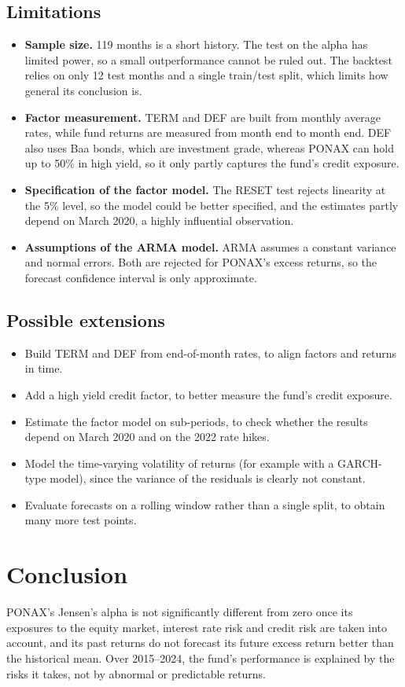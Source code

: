 \documentclass[11pt,a4paper]{article}
\begin{document}
\subsection{Limitations}

\begin{itemize}
\item \textbf{Sample size.} 119 months is a short history. The test on the alpha has limited power, so a small outperformance cannot be ruled out. The backtest relies on only 12 test months and a single train/test split, which limits how general its conclusion is.
\item \textbf{Factor measurement.} TERM and DEF are built from monthly average rates, while fund returns are measured from month end to month end. DEF also uses Baa bonds, which are investment grade, whereas PONAX can hold up to 50\% in high yield, so it only partly captures the fund's credit exposure.
\item \textbf{Specification of the factor model.} The RESET test rejects linearity at the 5\% level, so the model could be better specified, and the estimates partly depend on March 2020, a highly influential observation.
\item \textbf{Assumptions of the ARMA model.} ARMA assumes a constant variance and normal errors. Both are rejected for PONAX's excess returns, so the forecast confidence interval is only approximate.
\end{itemize}

\subsection{Possible extensions}

\begin{itemize}
\item Build TERM and DEF from end-of-month rates, to align factors and returns in time.
\item Add a high yield credit factor, to better measure the fund's credit exposure.
\item Estimate the factor model on sub-periods, to check whether the results depend on March 2020 and on the 2022 rate hikes.
\item Model the time-varying volatility of returns (for example with a GARCH-type model), since the variance of the residuals is clearly not constant.
\item Evaluate forecasts on a rolling window rather than a single split, to obtain many more test points.
\end{itemize}

\section{Conclusion}

PONAX's Jensen's alpha is not significantly different from zero once its exposures to the equity market, interest rate risk and credit risk are taken into account, and its past returns do not forecast its future excess return better than the historical mean. Over 2015--2024, the fund's performance is explained by the risks it takes, not by abnormal or predictable returns.
\end{document}
